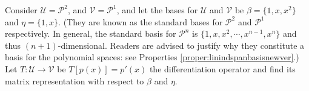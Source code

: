 \begin{exmp}
\label{exmp:lineartransderivative}
Consider $\mathcal{U} = \mathcal{P}^2$, and $\mathcal{V} = \mathcal{P}^1$, and let the bases for $\mathcal{U}$ and $\mathcal{V}$ be $\mathcal{\beta} = \{1, x, x^2\}$ and $\mathcal{\eta} = \{1, x\}$. (They are known as the standard bases for $\mathcal{P}^2$ and $\mathcal{P}^1$ respectively. In general, the standard basis for $\mathcal{P}^n$ is $\{1, x, x^2, \cdots, x^{n-1}, x^n\}$ and thus $(n+1)$-dimensional. Readers are advised to justify why they constitute a basis for the polynomial spaces: see Properties \ref{proper:linindspanbasisnewver}.) Let $T: \mathcal{U} \to \mathcal{V}$ be $T[p(x)] = p'(x)$ the differentiation operator and find its matrix representation with respect to $\mathcal{\beta}$ and $\mathcal{\eta}$.
\end{exmp}
